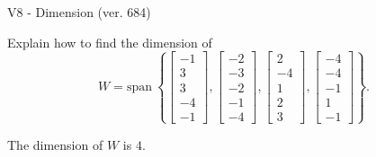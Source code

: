 \begin{exercise}
  \begin{exerciseTitle}V8 - Dimension (ver. 684)\end{exerciseTitle}
  \begin{exerciseStatement}
    Explain how to find the dimension of 
\[W=\mathrm{span}\ \left\{\left[\begin{array}{r}
-1 \\
3 \\
3 \\
-4 \\
-1
\end{array}\right] , \left[\begin{array}{r}
-2 \\
-3 \\
-2 \\
-1 \\
-4
\end{array}\right] , \left[\begin{array}{r}
2 \\
-4 \\
1 \\
2 \\
3
\end{array}\right] , \left[\begin{array}{r}
-4 \\
-4 \\
-1 \\
1 \\
-1
\end{array}\right]\right\}.\]



  \end{exerciseStatement}
  \begin{exerciseAnswer}
   The dimension of \(W\) is  \(4\).
  


  \end{exerciseAnswer}
\end{exercise}